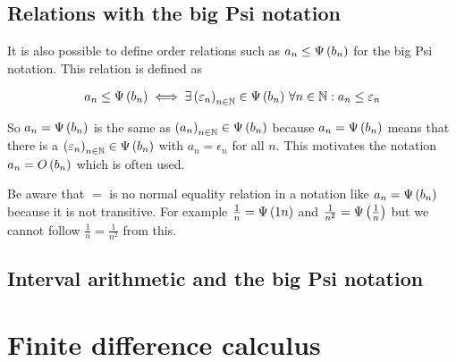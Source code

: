 

\subsection{Relations with the big Psi notation}

It is also possible to define order relations such as $a_n \le \Psi\left( {b_n} \right)$ for the big Psi notation. This relation is defined as

\begin{align}
  a_n \le \Psi\left( {b_n} \right) \iff \exists \left({\varepsilon_n}\right)_{{n}\in\mathbb N} \in \Psi\left( {b_n} \right)\,\forall n\in\mathbb N: a_n \le \varepsilon_n
\end{align}

So $a_n = \Psi\left( {b_n} \right)$ is the same as $\left({a_n}\right)_{{n}\in\mathbb N} \in \Psi\left( {b_n} \right)$ because $a_n = \Psi\left( {b_n} \right)$ means that there is a $\left({\varepsilon_n}\right)_{{n}\in\mathbb N}\in\Psi\left( {b_n} \right)$ with $a_n=\epsilon_n$ for all $n$. This motivates the notation $a_n = O\left( {b_n} \right)$ which is often used. 

Be aware that $=$ is no normal equality relation in a notation like $a_n = \Psi\left( {b_n} \right)$ because it is not transitive. For example $\frac 1n = \Psi\left( {1n} \right)$ and $\frac 1{n^2} = \Psi\left( {\frac 1n} \right)$ but we cannot follow $\frac 1n=\frac 1{n^2}$ from this. 


\subsection{Interval arithmetic and the big Psi notation}

\section{Finite difference calculus}


